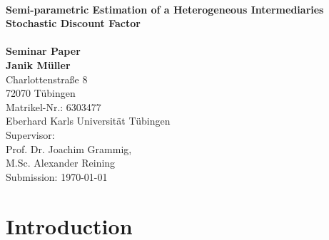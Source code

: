 \documentclass[12pt,a4paper]{article}
\begin{document}
		\begin{titlepage}\label{sec:title}	
			\begin{center}
				{\huge \bfseries \hrulefill\\
					Semi-parametric Estimation of a Heterogeneous Intermediaries Stochastic Discount Factor\\
					\hrulefill}\\[4mm]
				{\Large \bfseries
					Seminar Paper\\[12mm]
					
					Janik Müller}\\
				Charlottenstraße 8\\
				72070 Tübingen\\
				Matrikel-Nr.: 6303477\\[10mm] 
				{\large 
					Eberhard Karls Universität Tübingen\\[2mm]
					Supervisor: \\
					Prof. Dr. Joachim Grammig, \\
					M.Sc. Alexander Reining  \\[2mm]
					Submission: \today}
			\end{center}
			\clearpage\thispagestyle{empty}\mbox{} %
		\end{titlepage}\restoregeometry	
		
		\tableofcontents
		\clearpage
		
		
\section{Introduction}

\end{document}
